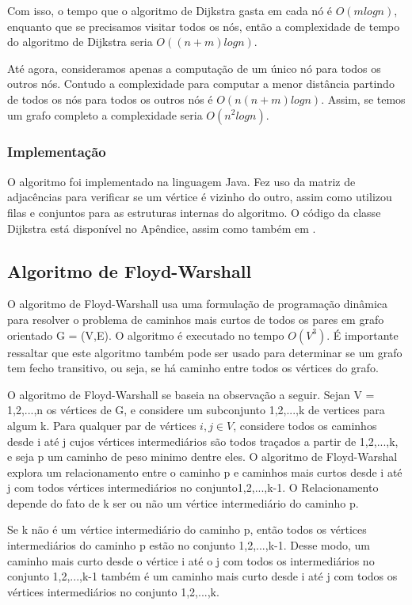 \documentclass[a4paper,12pt]{article}
\begin{document}
Com isso, o tempo que o algoritmo de Dijkstra gasta em cada nó é \emph{$O(m log n)$}, enquanto que se precisamos visitar todos os nós, então a complexidade de tempo do algoritmo de Dijkstra seria \emph{$O((n+m)log n)$}.

Até agora, consideramos apenas a computação de um único nó para todos os outros nós. Contudo a complexidade para computar a menor distância partindo de todos os nós para todos os outros nós é \emph{$O(n (n+m)log n)$}. Assim, se temos um grafo completo a complexidade seria \emph{$O(n^2 log n)$}.

\subsubsection{Implementação}
O algoritmo foi implementado na linguagem Java. Fez uso da matriz de adjacências para verificar se um vértice é vizinho do outro, assim como utilizou filas e conjuntos para as estruturas internas do algoritmo. O código da classe Dijkstra está disponível no Apêndice, assim como também em \cite{niltonvasques}.

\newpage
\subsection{Algoritmo de Floyd-Warshall}
O algoritmo de Floyd-Warshall usa uma formulação de programação dinâmica para resolver o problema de caminhos mais curtos de todos os pares em grafo orientado G = (V,E). O algoritmo é executado no tempo \emph{$O(V^3)$}. É importante ressaltar que este algoritmo também pode ser usado para determinar se um grafo tem fecho transitivo, ou seja, se há caminho entre todos os vértices do grafo\cite{yorkCollege}.

O algoritmo de Floyd-Warshall se baseia na observação a seguir. Sejan V = {1,2,...,n} os vértices de G, e considere um subconjunto {1,2,...,k} de vertices  para algum k. Para qualquer par de vértices $i,j \in V$, considere todos os caminhos desde i até j cujos vértices intermediários são todos traçados a partir de {1,2,...,k}, e seja p um caminho de peso minimo dentre eles. O algoritmo de Floyd-Warshal explora um relacionamento entre o caminho p e caminhos mais curtos desde i até j com todos vértices intermediários no conjunto{1,2,...,k-1}. O Relacionamento depende do fato de k ser ou não um vértice intermediário do caminho p.

Se k não é um vértice intermediário do caminho p, então todos os vértices intermediários do caminho p estão no conjunto {1,2,...,k-1}. Desse modo, um caminho mais curto desde o vértice i até o j com todos os intermediários no conjunto {1,2,...,k-1} também é um caminho mais curto desde i até j com todos os vértices intermediários no conjunto {1,2,...,k}.
\end{document}
